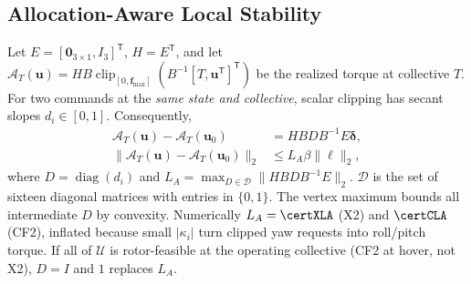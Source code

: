 \documentclass[letterpaper, 10 pt, conference]{ieeeconf}
\newcommand{\T}{^{\mathsf T}}
\newcommand{\clip}{\operatorname{clip}}
\begin{document}
\subsection{Allocation-Aware Local Stability}
\label{sec:local}
Let $E=[\bm0_{3\times1},I_3]\T$, $H=E\T$, and let
$\mathcal A_T(\bm u)=HB\clip_{[0,\bm f_{\max}]}(B^{-1}[T,\bm u\T]\T)$
be the realized torque at collective $T$. For two commands at the
\emph{same state and collective}, scalar clipping has secant slopes
$d_i\in[0,1]$. Consequently,
\begin{align}
 \mathcal A_T(\bm u)-\mathcal A_T(\bm u_0)
 &=HBDB^{-1}E\bm\delta,\\
 \|\mathcal A_T(\bm u)-\mathcal A_T(\bm u_0)\|_2
 &\le L_A\beta\|\bm\ell\|_2,
 \label{eq:allocbound}
\end{align}
where $D=\operatorname{diag}(d_i)$ and
$L_A=\max_{D\in\mathcal D}\|HBDB^{-1}E\|_2$.
$\mathcal D$ is the set of sixteen diagonal matrices with entries
in $\{0,1\}$. The vertex maximum bounds all intermediate $D$ by convexity.
Numerically $L_A=\certXLA$ (X2) and $\certCLA$ (CF2), inflated because
small $|\kappa_i|$ turn clipped yaw requests into roll/pitch torque. If all
of $\mathcal U$ is rotor-feasible at the operating collective (CF2 at hover,
not X2), $D=I$ and $1$ replaces $L_A$.
\end{document}
